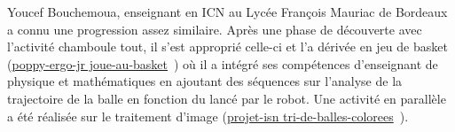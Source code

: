             Youcef Bouchemoua, enseignant en ICN au Lycée François Mauriac de Bordeaux a connu une progression assez similaire. Après une phase de découverte avec l'activité chamboule tout, il s'est approprié celle-ci et l'a dérivée en jeu de basket (\cf \href{https://forum.poppy-project.org/t/poppy-ergo-jr-joue-au-basket/3157}{poppy-ergo-jr joue-au-basket}~) où il a intégré ses compétences d'enseignant de physique et mathématiques en ajoutant des séquences sur l'analyse de la trajectoire de la balle en fonction du lancé par le robot. Une activité en parallèle a été réalisée sur le traitement d'image (\cf \href{https://forum.poppy-project.org/t/projet-isn-tri-de-balles-colorees/2511}{projet-isn tri-de-balles-colorees}~).\par%
